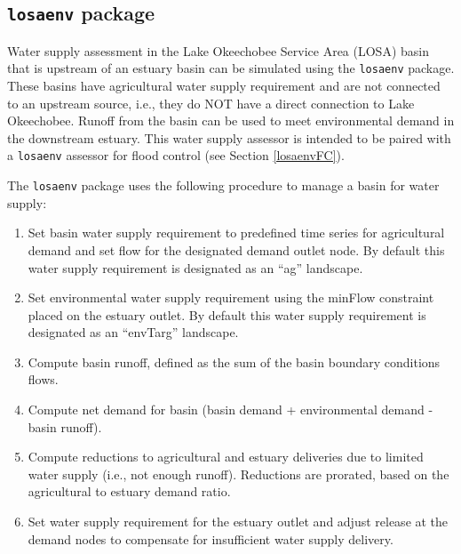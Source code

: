 \subsection{{\tt losaenv} package }\label{losaenvWS}

Water supply assessment in the Lake Okeechobee Service Area (LOSA)
basin that is upstream of an estuary basin can be simulated using the
{\tt losaenv} package.  These basins have agricultural water supply
requirement and are not connected to an upstream source, i.e., they do
NOT have a direct connection to Lake Okeechobee.  Runoff from the
basin can be used to meet environmental demand in the downstream
estuary.  This water supply assessor is intended to be paired with a
{\tt losaenv} assessor for flood control (see
Section \ref{losaenvFC}).

The {\tt losaenv} package uses the following procedure to manage a
basin for water supply:

\begin{enumerate}

 \item Set basin water supply requirement to predefined time series
 for agricultural demand and set flow for the designated demand outlet
 node.  By default this water supply requirement is designated as an
 ``ag'' landscape.

 \item Set environmental water supply requirement using the minFlow
 constraint placed on the estuary outlet.  By default this water
 supply requirement is designated as an ``envTarg'' landscape.

 \item Compute basin runoff, defined as the sum of the basin boundary
   conditions flows.

 \item Compute net demand for basin (basin demand + environmental
 demand - basin runoff).

 \item Compute reductions to agricultural and estuary deliveries due
   to limited water supply (i.e., not enough runoff).  Reductions are
   prorated, based on the agricultural to estuary demand ratio.

 \item Set water supply requirement for the estuary outlet and adjust
   release at the demand nodes to compensate for insufficient water
   supply delivery.

\end{enumerate}

